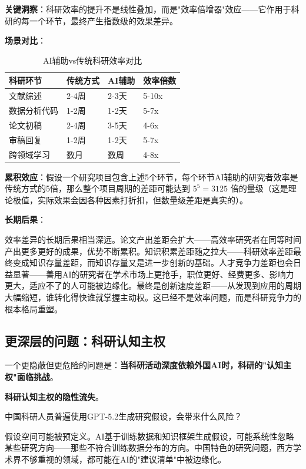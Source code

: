 \textbf{关键洞察}：科研效率的提升不是线性叠加，而是"效率倍增器"效应——它作用于科研的每一个环节，最终产生指数级的效果差异。

\textbf{场景对比}：

\begin{table}[H]
\centering
\caption{AI辅助vs传统科研效率对比}
\small
\begin{tabular}{p{2.8cm}p{3.8cm}p{3.8cm}p{2cm}}
\toprule
\textbf{科研环节} & \textbf{传统方式} & \textbf{AI辅助} & \textbf{效率倍数} \\
\midrule
文献综述 & 2-4周 & 2-3天 & 5-10x \\
数据分析代码 & 1-2周 & 1-2天 & 5-7x \\
论文初稿 & 2-4周 & 3-5天 & 4-6x \\
审稿回复 & 1-2周 & 1-2天 & 5-7x \\
跨领域学习 & 数月 & 数周 & 4-8x \\
\bottomrule
\end{tabular}
\end{table}

\textbf{累积效应}：假设一个研究项目包含上述5个环节，每个环节AI辅助的研究者效率是传统方式的5倍，那么整个项目周期的差距可能达到 $5^5 = 3125$ 倍的量级（这是理论极值，实际效果会因各种因素打折扣，但数量级差距是真实的）。

\textbf{长期后果}：

效率差异的长期后果相当深远。论文产出差距会扩大——高效率研究者在同等时间产出更多更好的成果，优势不断累积。知识积累差距随之拉大——科研效率差距最终变成知识存量差距，而知识存量又是进一步创新的基础。人才竞争力差距也会日益显著——善用AI的研究者在学术市场上更抢手，职位更好、经费更多、影响力更大，适应不了的人可能被边缘化。最终是创新速度差距——从发现到应用的周期大幅缩短，谁转化得快谁就掌握主动权。这已经不是效率问题，而是科研竞争力的根本格局重塑。

\subsection{更深层的问题：科研认知主权}

一个更隐蔽但更危险的问题是：\textbf{当科研活动深度依赖外国AI时，科研的"认知主权"面临挑战}。

\textbf{科研认知主权的隐性流失}。

中国科研人员普遍使用GPT-5.2生成研究假设，会带来什么风险？

假设空间可能被预定义。AI基于训练数据和知识框架生成假设，可能系统性忽略某些研究方向——那些不符合训练数据分布的方向。中国特色的研究问题，西方学术界不够重视的领域，都可能在AI的"建议清单"中被边缘化。

